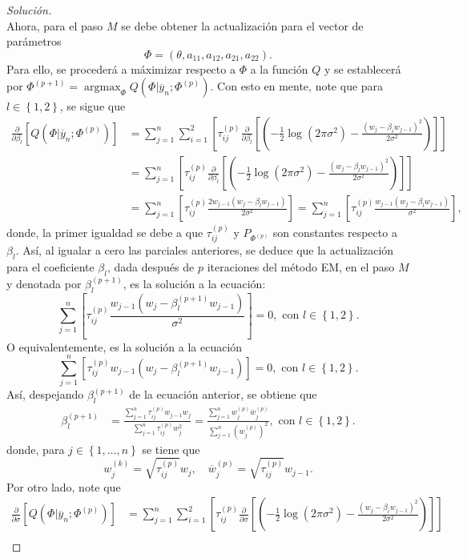 \documentclass[10.5pt,notitlepage]{article}
\newenvironment{solucion}
  {\begin{proof}[Solución]}
  {\end{proof}}
\DeclareMathOperator{\argmax}{argmax}
\newcommand{\corch}[1]{\left[ #1 \right]}
\newcommand{\kis}[1]{\left\{ #1 \right\}}
\newcommand{\pare}[1]{\left( #1 \right)}
\theoremstyle{plain}
\begin{document}
\begin{solucion}
\[\]
Ahora, para el paso \(M\) se debe obtener la actualización para el vector de parámetros \[\Phi = (\theta, a_{11},a_{12},a_{21},a_{22}).\] Para ello, se procederá a máximizar respecto a \(\Phi\) a la función \(Q\) y se establecerá por \(\Phi^{(p+1)} = \argmax_{\Phi}Q(\Phi| \overline{y}_{n}; \Phi^{(p)})\). Con esto en mente, note que para \(l \in \kis{1,2}\), se sigue que 
\begin{align*}
\frac{\partial }{\partial \beta_{l}}\corch{Q(\Phi| \overline{y}_{n}; \Phi^{(p)})} &= \sum_{j = 1}^{n}\sum_{i = 1}^{2}\corch{\tau_{ij}^{(p)}\frac{\partial }{\partial \beta_{l}}\corch{ \pare{-\frac{1}{2}\log(2 \pi \sigma^2) - \frac{(w_{j} - \beta_{i}w_{j-1})^2}{2\sigma^2}}} }\\
&= \sum_{j = 1}^{n}\corch{\tau_{ij}^{(p)}\frac{\partial }{\partial \beta_{l}}\corch{ \pare{-\frac{1}{2}\log(2 \pi \sigma^2) - \frac{(w_{j} - \beta_{l}w_{j-1})^2}{2\sigma^2}}} }\\
&= \sum_{j = 1}^{n}\corch{\tau_{ij}^{(p)}\frac{2w_{j-1}(w_{j} - \beta_{l}w_{j-1})}{2\sigma^2}}= \sum_{j = 1}^{n}\corch{\tau_{ij}^{(p)}\frac{w_{j-1}(w_{j} - \beta_{l}w_{j-1})}{\sigma^2}},
\end{align*}
donde, la primer igualdad se debe a que \(\tau_{ij}^{(p)}\) y \(P_{\Phi^{(p)}}\) son constantes respecto a \(\beta_{l}\). Así, al igualar a cero las parciales anteriores, se deduce que la actualización para el coeficiente \(\beta_{l}\), dada después de \(p\) iteraciones del método EM, en el paso \(M\) y denotada por \(\beta_{l}^{(p+1)}\), es la solución a la ecuación: 
\[
\sum_{j = 1}^{n}\corch{\tau_{ij}^{(p)}\frac{w_{j-1}(w_{j} - \beta_{l}^{(p+1)}w_{j-1})}{\sigma^2}} = 0, \text{ con } l \in \kis{1,2}.
\]
O equivalentemente, es la solución a la ecuación 
\[
\sum_{j = 1}^{n}\corch{\tau_{ij}^{(p)}w_{j-1}(w_{j} - \beta_{l}^{(p+1)}w_{j-1})} = 0, \text{ con } l \in \kis{1,2}.
\]
Así, despejando \(\beta_{l}^{(p+1)}\) de la ecuación anterior, se obtiene que 
\begin{align}
\beta_{l}^{(p+1)} &= \frac{\sum_{j = 1}^{n}\tau_{ij}^{(p)}w_{j-1}w_{j}}{\sum_{j = 1}^{n}\tau_{ij}^{(p)}w_{j}^2} = \frac{\sum_{j = 1}^{n}w_{j}^{(p)}\overline{w}_{j}^{(p)}}{\sum_{j = 1}^{n}(w_{j}^{(p)})^2},  \text{ con } l \in \kis{1,2}. \label{betas}
\end{align}
donde, para \(j \in \kis{1, \hdots, n}\) se tiene que
\[
w_{j}^{(k)} = \sqrt{\tau_{ij}^{(p)}}w_{j}, \quad \overline{w}_{j}^{(p)} =\sqrt{\tau_{ij}^{(p)}}w_{j - 1}. 
\]
Por otro lado, note que 
\begin{align*}
\frac{\partial }{\partial \sigma}\corch{Q(\Phi| \overline{y}_{n}; \Phi^{(p)})} &= \sum_{j = 1}^{n}\sum_{i = 1}^{2}\corch{\tau_{ij}^{(p)}\frac{\partial }{\partial \sigma}\corch{ \pare{-\frac{1}{2}\log(2 \pi \sigma^2) - \frac{(w_{j} - \beta_{i}w_{j-1})^2}{2\sigma^2}}} }\\

\end{align*}
\end{solucion}
\end{document}
